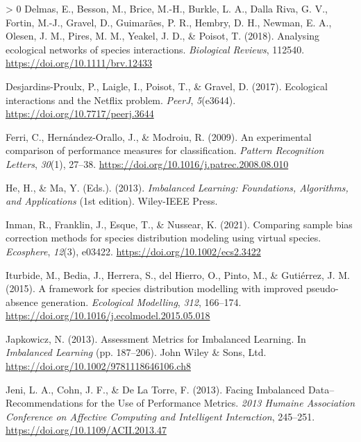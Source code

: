 \documentclass[10pt,oneside]{article}
\newlength{\cslhangindent}
\newenvironment{CSLReferences}[3] %
 {%
  \setlength{\parindent}{0pt}
  \ifodd #1 \everypar{\setlength{\hangindent}{\cslhangindent}}\ignorespaces\fi
  \ifnum #2 > 0
  \setlength{\parskip}{#2\baselineskip}
  \fi
 }%
 {}
\begin{document}
\begin{CSLReferences}{1}{0}
\leavevmode\hypertarget{ref-Delmas2018AnaEco}{}%
Delmas, E., Besson, M., Brice, M.-H., Burkle, L. A., Dalla Riva, G. V.,
Fortin, M.-J., Gravel, D., Guimarães, P. R., Hembry, D. H., Newman, E.
A., Olesen, J. M., Pires, M. M., Yeakel, J. D., \& Poisot, T. (2018).
Analysing ecological networks of species interactions. \emph{Biological
Reviews}, 112540. \url{https://doi.org/10.1111/brv.12433}

\leavevmode\hypertarget{ref-Desjardins-Proulx2017EcoInt}{}%
Desjardins-Proulx, P., Laigle, I., Poisot, T., \& Gravel, D. (2017).
Ecological interactions and the Netflix problem. \emph{PeerJ},
\emph{5}(e3644). \url{https://doi.org/10.7717/peerj.3644}

\leavevmode\hypertarget{ref-Ferri2009ExpCom}{}%
Ferri, C., Hernández-Orallo, J., \& Modroiu, R. (2009). An experimental
comparison of performance measures for classification. \emph{Pattern
Recognition Letters}, \emph{30}(1), 27--38.
\url{https://doi.org/10.1016/j.patrec.2008.08.010}

\leavevmode\hypertarget{ref-He2013ImbLea}{}%
He, H., \& Ma, Y. (Eds.). (2013). \emph{Imbalanced Learning:
Foundations, Algorithms, and Applications} (1st edition). Wiley-IEEE
Press.

\leavevmode\hypertarget{ref-Inman2021ComSam}{}%
Inman, R., Franklin, J., Esque, T., \& Nussear, K. (2021). Comparing
sample bias correction methods for species distribution modeling using
virtual species. \emph{Ecosphere}, \emph{12}(3), e03422.
\url{https://doi.org/10.1002/ecs2.3422}

\leavevmode\hypertarget{ref-Iturbide2015FraSpe}{}%
Iturbide, M., Bedia, J., Herrera, S., del Hierro, O., Pinto, M., \&
Gutiérrez, J. M. (2015). A framework for species distribution modelling
with improved pseudo-absence generation. \emph{Ecological Modelling},
\emph{312}, 166--174.
\url{https://doi.org/10.1016/j.ecolmodel.2015.05.018}

\leavevmode\hypertarget{ref-Japkowicz2013AssMet}{}%
Japkowicz, N. (2013). Assessment Metrics for Imbalanced Learning. In
\emph{Imbalanced Learning} (pp. 187--206). John Wiley \& Sons, Ltd.
\url{https://doi.org/10.1002/9781118646106.ch8}

\leavevmode\hypertarget{ref-Jeni2013FacImb}{}%
Jeni, L. A., Cohn, J. F., \& De La Torre, F. (2013). Facing Imbalanced
Data--Recommendations for the Use of Performance Metrics. \emph{2013
Humaine Association Conference on Affective Computing and Intelligent
Interaction}, 245--251. \url{https://doi.org/10.1109/ACII.2013.47}


\end{CSLReferences}
\end{document}
